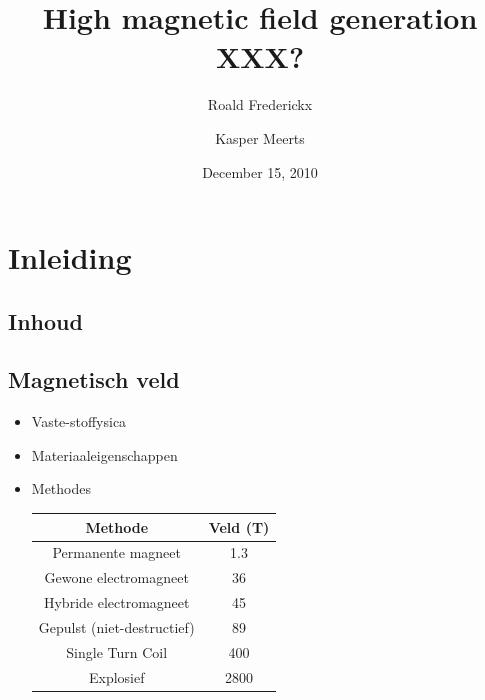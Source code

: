 \documentclass{beamer}
\title{High magnetic field generation {\LARGE XXX?} }
\author{Roald Frederickx \and Kasper Meerts}
\date{December 15, 2010}
\begin{document}
\begin{frame}
\titlepage
\end{frame}

\section{Inleiding}
\subsection{Inhoud}
\begin{frame}
\tableofcontents[hideallsubsections]
\end{frame}

\subsection{Magnetisch veld}
\begin{frame}
\begin{itemize}
\item Vaste-stoffysica
\item Materiaaleigenschappen
\item Methodes
\begin{table}
\begin{center}
\begin{tabular}{c|c}
Methode & Veld (T) \\
\hline
Permanente magneet & 1.3\\
Gewone electromagneet & 36\\
Hybride electromagneet & 45\\
Gepulst (niet-destructief) & 89\\
Single Turn Coil & 400\\
Explosief & 2800 \\
\end{tabular}
\end{center}
\end{table}
\end{itemize}
\end{frame}
\end{document}
